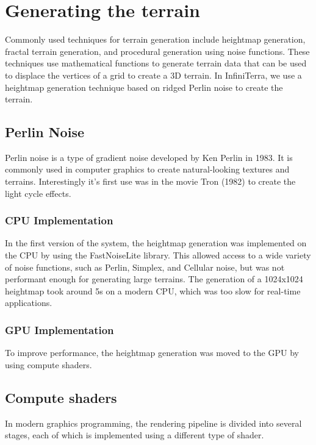 \documentclass{report}
\begin{document}


\chapter{Generating the terrain}
\label{ch:generating-the-terrain}
Commonly used techniques for terrain generation include heightmap generation, fractal terrain generation, and procedural generation using noise functions.
These techniques use mathematical functions to generate terrain data that can be used to displace the vertices of a grid to create a 3D terrain.
In InfiniTerra, we use a heightmap generation technique based on ridged Perlin noise to create the terrain.
\section*{Perlin Noise}
Perlin noise is a type of gradient noise developed by Ken Perlin in 1983. It is commonly used in computer graphics to create natural-looking textures and terrains.
Interestingly it's first use was in the movie Tron (1982) to create the light cycle effects.
\subsection*{CPU Implementation}
In the first version of the system, the heightmap generation was implemented on the CPU by using the FastNoiseLite library.
This allowed access to a wide variety of noise functions, such as Perlin, Simplex, and Cellular noise, but was not performant enough for generating large terrains.
The generation of a 1024x1024 heightmap took around 5s on a modern CPU, which was too slow for real-time applications.
\subsection*{GPU Implementation}
To improve performance, the heightmap generation was moved to the GPU by using compute shaders.

\section*{Compute shaders}
In modern graphics programming, the rendering pipeline is divided into several stages, each of which is implemented using a different type of shader.
\end{document}
